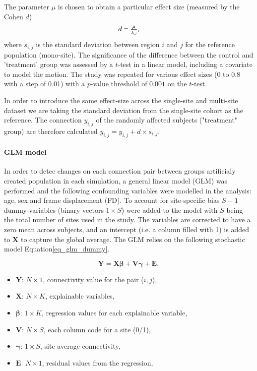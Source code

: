 \documentclass[authoryear]{elsarticle}
\begin{document}
The parameter $\mu$ is chosen to obtain a particular effect size (measured by the Cohen $d$)
\begin{equation}
\label{eq_cohen}
    \begin{array}{l l}
      d = \frac{\mu}{s_{i,j}},      
    \end{array}
\end{equation}
where $s_{i,j}$ is the standard deviation between region $i$ and $j$ for the reference population (mono-site). The significance of the difference between the control and 'treatment' group was assessed by a $t$-test in a linear model, including a covariate to model the motion. The study was repeated for various effect sizes (0 to 0.8 with a step of 0.01) with a $p$-value threshold of $0.001$ on the $t$-test.

In order to introduce the same effect-size across the single-site and multi-site dataset we are taking the standard deviation from the single-site cohort as the reference.  The connection $y_{i,j}$ of the randomly affected subjects ("treatment" group) are therefore calculated $y_{i,j} = y_{i,j} + d\times s_{i,j}$. 

\paragraph{GLM model} 
In order to detec changes on each connection pair between groups artificialy created population in each simulation, a general linear model (GLM) was performed and the following confounding variables were modelled in the analysis: age, sex and frame displacement (FD). To account for site-specific bias $S-1$ dummy-variables (binary vectors $1\times S$) were added to the model with $S$ being the total number of sites used in the study. The variables are corrected to have a zero mean across subjects, and an intercept (i.e. a column filled with 1) is added to $\mathbf{X}$ to capture the global average. The GLM relies on the following stochastic model Equation\ref{eq_glm_dummy}.

\begin{equation}
 \label{eq_glm_dummy}
  \mathbf{Y} = \mathbf{X}\mathbf{\beta} + \mathbf{V}\mathbf{\gamma}+ \mathbf{E},
\end{equation}
\begin{itemize}
  \item $\mathbf{Y}$: $N\times 1$, connectivity value for the pair ($i,j$),
  \item $\mathbf{X}$: $N\times K$, explainable variables,
  \item $\mathbf{\beta}$: $1 \times K$, regression values for each explainable variable,
  \item $\mathbf{V}$: $N\times S$, each column code for a site (0/1),
  \item $\mathbf{\gamma}$: $1\times S$, site average connectivity,
  \item $\mathbf{E}$: $N\times 1$, residual values from the regression,
\end{itemize}
 
\end{document}

